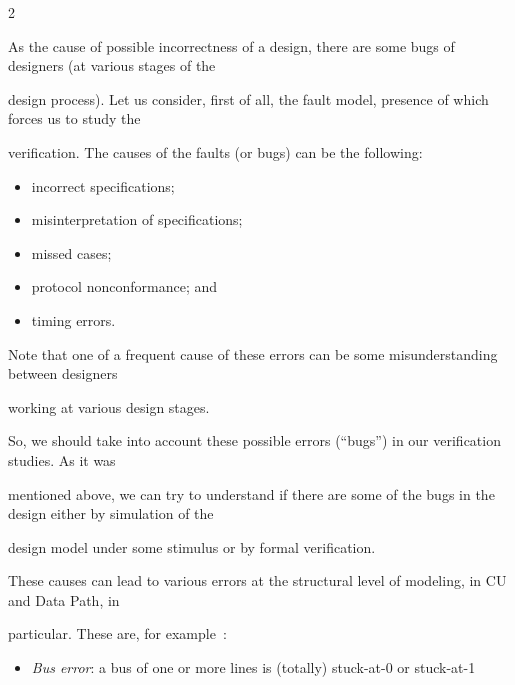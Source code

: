 \begin{multicols}{2}
\noindent


As the cause of possible incorrectness of a design, there are some bugs of designers (at various stages of the


design process). Let us consider, first of all, the fault model, presence of which forces us to study the


verification. The causes of the faults (or bugs) can be the following:


 \begin{itemize}


\item incorrect specifications;


\item misinterpretation of specifications;


\item missed cases;


\item protocol nonconformance; and


\item timing errors.


\end{itemize}





   Note that one of a frequent cause of these errors can be some misunderstanding between designers


working at  various design stages.





   So, we should take into account these possible errors (``bugs'') in our verification studies. As it was


mentioned above, we can try to understand if there are some of the bugs in the design either by simulation of the


design model under some stimulus or by formal verification.





   These causes can lead to various errors at the structur\-al level of modeling, in CU and Data Path, in


particular. These are, for example~\cite{6bar}:


   \begin{itemize}


\item \textit{Bus  error}: a bus of one or more lines is (totally) stuck-at-0 or stuck-at-1



\end{itemize}
\end{multicols}
